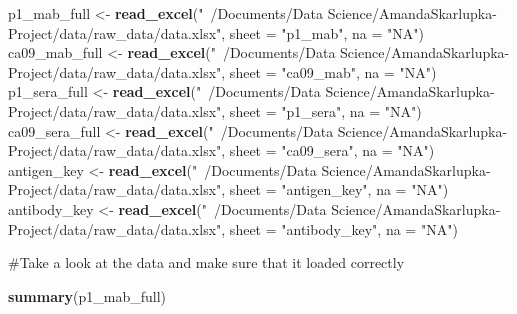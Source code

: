 \documentclass[]{article}
\newenvironment{Shaded}{\begin{snugshade}}{\end{snugshade}}
\newcommand{\DataTypeTok}[1]{\textcolor[rgb]{0.13,0.29,0.53}{#1}}
\newcommand{\KeywordTok}[1]{\textcolor[rgb]{0.13,0.29,0.53}{\textbf{#1}}}
\newcommand{\NormalTok}[1]{#1}
\newcommand{\StringTok}[1]{\textcolor[rgb]{0.31,0.60,0.02}{#1}}
\begin{document}
\begin{Shaded}
\begin{Highlighting}[]
\NormalTok{p1_mab_full <-}\StringTok{ }\KeywordTok{read_excel}\NormalTok{(}\StringTok{"~/Documents/Data Science/AmandaSkarlupka-Project/data/raw_data/data.xlsx"}\NormalTok{, }
                      \DataTypeTok{sheet =} \StringTok{"p1_mab"}\NormalTok{, }\DataTypeTok{na =} \StringTok{"NA"}\NormalTok{)}
\NormalTok{ca09_mab_full <-}\StringTok{ }\KeywordTok{read_excel}\NormalTok{(}\StringTok{"~/Documents/Data Science/AmandaSkarlupka-Project/data/raw_data/data.xlsx"}\NormalTok{, }
                      \DataTypeTok{sheet =} \StringTok{"ca09_mab"}\NormalTok{, }\DataTypeTok{na =} \StringTok{"NA"}\NormalTok{)}
\NormalTok{p1_sera_full <-}\StringTok{ }\KeywordTok{read_excel}\NormalTok{(}\StringTok{"~/Documents/Data Science/AmandaSkarlupka-Project/data/raw_data/data.xlsx"}\NormalTok{, }
                        \DataTypeTok{sheet =} \StringTok{"p1_sera"}\NormalTok{, }\DataTypeTok{na =} \StringTok{"NA"}\NormalTok{)}
\NormalTok{ca09_sera_full <-}\StringTok{ }\KeywordTok{read_excel}\NormalTok{(}\StringTok{"~/Documents/Data Science/AmandaSkarlupka-Project/data/raw_data/data.xlsx"}\NormalTok{, }
                        \DataTypeTok{sheet =} \StringTok{"ca09_sera"}\NormalTok{, }\DataTypeTok{na =} \StringTok{"NA"}\NormalTok{)}
\NormalTok{antigen_key <-}\StringTok{ }\KeywordTok{read_excel}\NormalTok{(}\StringTok{"~/Documents/Data Science/AmandaSkarlupka-Project/data/raw_data/data.xlsx"}\NormalTok{, }
                   \DataTypeTok{sheet =} \StringTok{"antigen_key"}\NormalTok{, }\DataTypeTok{na =} \StringTok{"NA"}\NormalTok{)}
\NormalTok{antibody_key <-}\StringTok{ }\KeywordTok{read_excel}\NormalTok{(}\StringTok{"~/Documents/Data Science/AmandaSkarlupka-Project/data/raw_data/data.xlsx"}\NormalTok{,}
                           \DataTypeTok{sheet =} \StringTok{"antibody_key"}\NormalTok{, }\DataTypeTok{na =} \StringTok{"NA"}\NormalTok{)}
\end{Highlighting}
\end{Shaded}

\#Take a look at the data and make sure that it loaded correctly

\begin{Shaded}
\begin{Highlighting}[]
\KeywordTok{summary}\NormalTok{(p1_mab_full)}
\end{Highlighting}
\end{Shaded}
\end{document}
